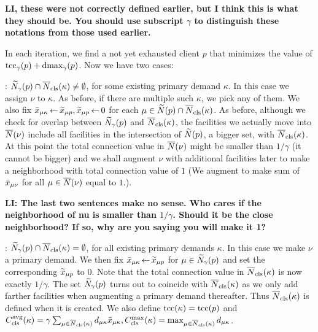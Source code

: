 {\Large\bf
LI, these were not correctly defined earlier, but I think this is what they
should be. You should use subscript $\gamma$ to distinguish these notations
from those used earlier.
}

In each iteration, we find a not yet exhausted client $p$ that minimizes the
value of $\textrm{tcc}_\gamma(p) + \text{dmax}_\gamma(p)$. Now we have two cases:

\begin{description}

\item{:} ${\widetilde N}_{\gamma}(p) \cap {\overline{N}}_{\text{cls}}(\kappa)\neq\emptyset$,
for some existing primary demand $\kappa$.
In this case we assign $\nu$ to
$\kappa$. As before, if there are multiple such $\kappa$, we pick any
of them. We also fix ${\bar x}_{\mu\kappa} {\,\leftarrow\,} {\widetilde x}_{\mu p},
{\widetilde x}_{\mu p}{\,\leftarrow\,} 0$ for each $\mu \in {\widetilde N}(p)\cap
{\overline{N}}_{\text{cls}}(\kappa)$. As before, although we check for overlap between
${\widetilde N}_{\gamma}(p)$ and ${\overline{N}}_{\text{cls}}(\kappa)$, the facilities we
actually move into ${\overline{N}}(\nu)$ include all facilities in the
intersection of ${\widetilde N}(p)$, a bigger set, with
${\overline{N}}_{\text{cls}}(\kappa)$. At this point the total connection value in
${\overline{N}}(\nu)$ might be smaller than $1/\gamma$ (it cannot be bigger)
and we shall augment $\nu$ with additional facilities later to make a
neighborhood with total connection value of $1$ (We augment to make
sum of ${\bar x}_{\mu\nu}$ for all $\mu\in{\overline{N}}(\nu)$ equal to $1$.).

{\Large\bf
LI: The last two sentences make no sense. Who cares if
the neighborhood of nu is smaller than $1/\gamma$. Should it be the 
close neighborhood? If so, why are you saying you will make it 1?
}

\item{:}
${\widetilde N}_{\gamma}(p) \cap {\overline{N}}_{\text{cls}}(\kappa) = \emptyset$,
for all existing primary demands $\kappa$.
In this case we make $\nu$ a primary demand. We then fix
${\bar x}_{\mu\kappa}{\,\leftarrow\,} {\widetilde x}_{\mu p}$ for $\mu \in
{\widetilde N}_{\gamma}(p)$ and set the corresponding ${\widetilde x}_{\mu p}$ to
$0$.  Note that the total connection value in ${\overline{N}}_{\text{cls}}(\kappa)$ is
now exactly
$1/\gamma$.  The set ${\widetilde N}_{\gamma}(p)$ turns out to coincide with
${\overline{N}}_{\text{cls}}(\kappa)$ as we only add farther facilities when
augmenting a primary demand thereafter. Thus ${\overline{N}}_{\text{cls}}(\kappa)$ is
defined when it is created. We also define $\textrm{tcc}(\kappa) = \textrm{tcc}(p)$
and
$C_{\text{cls}}^{{\mbox{\scriptsize\rm avg}}}(\kappa)=\gamma\sum_{\mu\in{\overline{N}}_{\text{cls}}(\kappa)}d_{\mu\kappa}{\bar x}_{\mu\kappa},
C_{\text{cls}}^{\max}(\kappa)=\max_{\mu\in{\overline{N}}_{\text{cls}}(\kappa)}d_{\mu\kappa}$.

\end{description}

